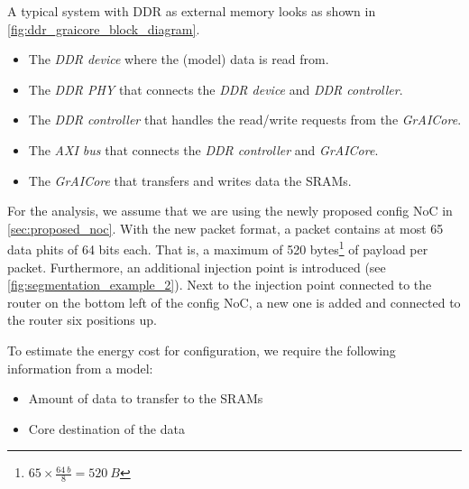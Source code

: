 A typical system with DDR as external memory looks as shown in \cref{fig:ddr_graicore_block_diagram}.
\begin{itemize}
    \item The \textit{DDR device} where the (model) data is read from.
    \item The \textit{DDR PHY} that connects the \textit{DDR device} and \textit{DDR controller}.
    \item The \textit{DDR controller} that handles the read/write requests from the \textit{GrAICore}.
    \item The \textit{AXI bus} that connects the \textit{DDR controller} and \textit{GrAICore}.
    \item The \textit{GrAICore} that transfers and writes data the SRAMs.
\end{itemize}



For the analysis, we assume that we are using the newly proposed config NoC in \cref{sec:proposed_noc}. 
With the new packet format, a packet contains at most 65 data phits of 64 bits each.
That is, a maximum of 520 bytes\footnote{$65 \times \frac{\SI{64}{b}}{8} = \SI{520}{B}$} of payload per packet.
Furthermore, an additional injection point is introduced (see \cref{fig:segmentation_example_2}).
Next to the injection point connected to the router on the bottom left of the config NoC, a new one is added and connected to the router six positions up.

To estimate the energy cost for configuration, we require the following information from a model:
\begin{itemize}
    \item Amount of data to transfer to the SRAMs
    \item Core destination of the data
\end{itemize}

